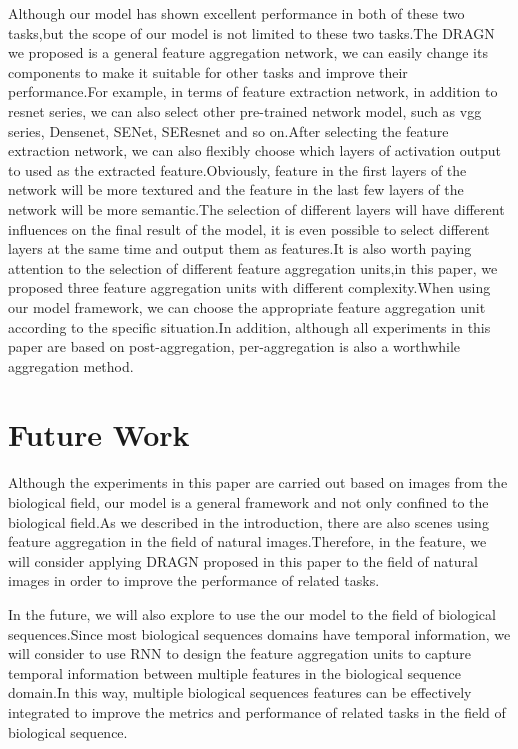 \documentclass[10pt,twocolumn,letterpaper]{article}
\begin{document}
Although our model has shown excellent performance in both of these two tasks,but the scope of our model is not limited to these two tasks.The DRAGN we proposed is a general feature aggregation network, we can easily change its components to make it suitable for other tasks and improve their performance.For example, in terms of feature extraction network, in addition to resnet series, we can also select other pre-trained network model, such as vgg series, Densenet, SENet, SEResnet and so on.After selecting the feature extraction network, we can also flexibly choose which layers of activation output to used as the extracted feature.Obviously, feature in the first layers of the network will be more textured and the feature in the last few layers of the network will be more semantic.The selection of different layers will have different influences on the final result of the model, it is even possible to select different layers at the same time and output them as features.It is also worth paying attention to the selection of different feature aggregation units,in this paper, we proposed three feature aggregation units with different complexity.When using our model framework, we can choose the appropriate feature aggregation unit according to the specific situation.In addition, although all experiments in this paper are based on post-aggregation, per-aggregation is also a worthwhile aggregation method.

\section{Future Work}
Although the experiments in this paper are carried out based on images from the biological field, our model is a general framework and not only confined to the biological field.As we described in the introduction, there are also scenes using feature aggregation in the field of natural images.Therefore, in the feature, we will consider applying DRAGN proposed in this paper to the field of natural images in order to improve the performance of related tasks.

In the future, we will also explore to use the our model to the field of biological sequences.Since most biological sequences domains have temporal information, we will consider to use RNN to design the feature aggregation units to capture temporal information between multiple features in the biological sequence domain.In this way, multiple biological sequences features can be effectively integrated to improve the metrics and performance of related tasks in the field of biological sequence.

{\small


}
\end{document}

